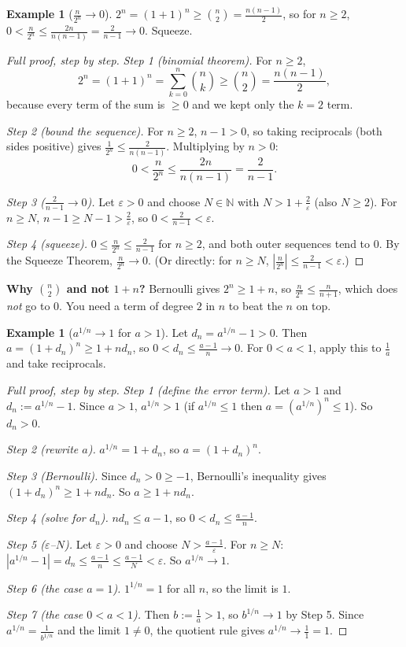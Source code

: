 \documentclass[11pt]{article}
\theoremstyle{definition}
\newtheorem{ex}[defn]{Example}
\newcommand{\N}{\mathbb{N}}
\newcommand{\eps}{\varepsilon}
\newcommand{\key}[1]{\textcolor{red!70!black}{\textbf{#1}}}
\begin{document}
\begin{ex}[$\frac{n}{2^n}\to0$]
$2^n=(1+1)^n\ge\binom n2=\frac{n(n-1)}{2}$, so for $n\ge2$,
$0<\frac n{2^n}\le\frac{2n}{n(n-1)}=\frac{2}{n-1}\to0$. Squeeze.

\begin{proof}[Full proof, step by step]
\emph{Step 1 (binomial theorem).} For $n\ge2$,
\[
2^n=(1+1)^n=\sum_{k=0}^n\binom nk\ge\binom n2=\frac{n(n-1)}2,
\]
because every term of the sum is $\ge0$ and we kept only the $k=2$ term.

\emph{Step 2 (bound the sequence).} For $n\ge2$, $n-1>0$, so taking
reciprocals (both sides positive) gives $\frac1{2^n}\le\frac{2}{n(n-1)}$.
Multiplying by $n>0$:
\[
0<\frac n{2^n}\le\frac{2n}{n(n-1)}=\frac2{n-1}.
\]

\emph{Step 3 ($\frac2{n-1}\to0$).} Let $\eps>0$ and choose $N\in\N$ with
$N>1+\frac2\eps$ (also $N\ge2$). For $n\ge N$, $n-1\ge N-1>\frac2\eps$, so
$0<\frac2{n-1}<\eps$.

\emph{Step 4 (squeeze).} $0\le\frac n{2^n}\le\frac2{n-1}$ for $n\ge2$,
and both outer sequences tend to $0$. By the Squeeze Theorem,
$\frac n{2^n}\to0$. (Or directly: for $n\ge N$,
$\left|\frac n{2^n}\right|\le\frac2{n-1}<\eps$.)
\end{proof}
\noindent\key{Why $\binom n2$ and not $1+n$?} Bernoulli gives
$2^n\ge1+n$, so $\frac n{2^n}\le\frac n{n+1}$, which does \emph{not} go to
$0$. You need a term of degree $2$ in $n$ to beat the $n$ on top.
\end{ex}

\begin{ex}[$a^{1/n}\to1$ for $a>1$]
Let $d_n=a^{1/n}-1>0$. Then $a=(1+d_n)^n\ge1+nd_n$, so
$0<d_n\le\frac{a-1}{n}\to0$. For $0<a<1$, apply this to $\frac1a$ and take
reciprocals.

\begin{proof}[Full proof, step by step]
\emph{Step 1 (define the error term).} Let $a>1$ and
$d_n:=a^{1/n}-1$. Since $a>1$, $a^{1/n}>1$ (if $a^{1/n}\le1$ then
$a=(a^{1/n})^n\le1$). So $d_n>0$.

\emph{Step 2 (rewrite $a$).} $a^{1/n}=1+d_n$, so $a=(1+d_n)^n$.

\emph{Step 3 (Bernoulli).} Since $d_n>0\ge-1$, Bernoulli's inequality
gives $(1+d_n)^n\ge1+nd_n$. So $a\ge1+nd_n$.

\emph{Step 4 (solve for $d_n$).} $nd_n\le a-1$, so
$0<d_n\le\frac{a-1}n$.

\emph{Step 5 ($\eps$--$N$).} Let $\eps>0$ and choose $N>\frac{a-1}\eps$.
For $n\ge N$:
$|a^{1/n}-1|=d_n\le\frac{a-1}n\le\frac{a-1}N<\eps$. So $a^{1/n}\to1$.

\emph{Step 6 (the case $a=1$).} $1^{1/n}=1$ for all $n$, so the limit is $1$.

\emph{Step 7 (the case $0<a<1$).} Then $b:=\frac1a>1$, so $b^{1/n}\to1$ by
Step 5. Since $a^{1/n}=\frac1{b^{1/n}}$ and the limit $1\ne0$, the quotient
rule gives $a^{1/n}\to\frac11=1$.
\end{proof}
\end{ex}
\end{document}
